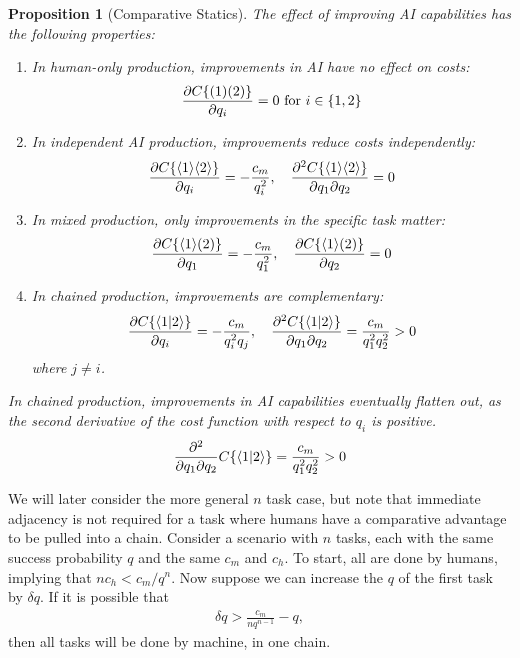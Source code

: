 \documentclass{article}
\theoremstyle{plain}
\theoremstyle{plain}
\newtheorem{proposition}[theorem]{Proposition}
\begin{document}
\begin{proposition}[Comparative Statics] \label{prop:comparative_statics}
  The effect of improving AI capabilities has the following properties:
  \begin{enumerate}
  \item In human-only production, improvements in AI have no effect on costs:
  \[\frac{\partial C\{ ( 1 )( 2 ) \}}{\partial q_i} = 0 \text{ for } i \in \{1,2\}\]
  \item In independent AI production, improvements reduce costs independently:
  \[\frac{\partial C\{ \langle 1 \rangle\langle 2 \rangle \}}{\partial q_i} = -\frac{c_m}{q_i^2}, \quad \frac{\partial^2 C\{ \langle 1 \rangle\langle 2 \rangle \}}{\partial q_1 \partial q_2} = 0\]
  \item In mixed production, only improvements in the specific task matter:
  \[\frac{\partial C\{ \langle 1 \rangle( 2 ) \}}{\partial q_1} = -\frac{c_m}{q_1^2}, \quad \frac{\partial C\{ \langle 1 \rangle( 2 ) \}}{\partial q_2} = 0\]
  \item In chained production, improvements are complementary:
  \[\frac{\partial C\{ \langle 1|2 \rangle \}}{\partial q_i} = -\frac{c_m}{q_i^2q_j}, \quad \frac{\partial^2 C\{ \langle 1|2 \rangle \}}{\partial q_1 \partial q_2} = \frac{c_m}{q_1^2q_2^2} > 0\]
  where $j \neq i$.
  \end{enumerate}

  In chained production, improvements in AI capabilities eventually flatten out, as the second derivative of the cost function with respect to $q_i$ is positive.
  \begin{equation}
      \frac{\partial^2}{\partial q_1 \partial q_2} C\{ \langle 1|2 \rangle \} = \frac{c_m}{q_1^2q_2^2} > 0
  \end{equation}

\end{proposition}
 
We will later consider the more general $n$ task case, but note that immediate adjacency is not required for a task where humans have a comparative advantage to be pulled into a chain.
Consider a scenario with $n$ tasks, each with the same success probability $q$ and the same $c_m$ and $c_h$.
To start, all are done by humans, implying that $n c_h < c_m / q^n$.
Now suppose we can increase the $q$ of the first task by $\delta q$. 
If it is possible that  
\begin{align}
  \delta q > \frac{c_m}{n q^{n-1}} - q,
\end{align} 
then all tasks will be done by machine, in one chain.
\end{document}
